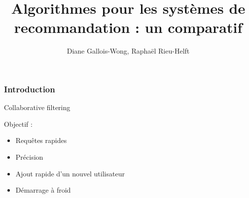 \documentclass[18pt]{beamer}
\title[Filtrage collaboratif]{Algorithmes pour les systèmes de recommandation : un comparatif}
\author{Diane Gallois-Wong, Raphaël Rieu-Helft}
\begin{document}
	\begin{frame}
		\titlepage
	\end{frame}
	\begin{frame}
		\frametitle{Introduction}
		Collaborative filtering
		
		\bigskip
		
		Objectif : \begin{itemize}
			\item Requêtes rapides
			\item Précision
			\item Ajout rapide d'un nouvel utilisateur
			\item Démarrage à froid
		\end{itemize}
	\end{frame}
	\begin{frame}
		
	\end{frame}
	\begin{frame}
		
	\end{frame}
	\begin{frame}
		
	\end{frame}
	\begin{frame}
		
	\end{frame}
	
\end{document}
